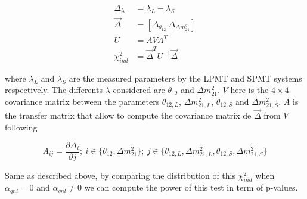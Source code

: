 \documentclass[../main.tex]{subfiles}
\begin{document}
\begin{align}
  \Delta_\lambda &= \lambda_{L} - \lambda_{S} \\
  \vec{\Delta} &= [ \Delta_{\theta_{12}} ~ \Delta_{\Delta m^2_{21}} ] \\
  U &= A V A^T \\
  \chi^2_{ind} &= \vec{\Delta}^T U^{-1} \vec{\Delta}
\end{align}

where $\lambda_{L}$ and $\lambda_{S}$ are the measured parameters by the LPMT and SPMT systems respectively. The differents $\lambda$ considered are $\theta_{12}$ and $\Delta m^2_{21}$. $V$ here is the $4\times 4$ covariance matrix between the parameters $\theta_{12, L}$, $\Delta m^2_{21, L}$, $\theta_{12, S}$ and  $\Delta m^2_{21, S}$. $A$ is the transfer matrix that allow to compute the covariance matrix de $\vec{\Delta}$ from $V$ following

\begin{equation}
  A_{ij} = \frac{\partial \Delta_i}{\partial j}; ~ i \in \{ \theta_{12}, \Delta m^2_{21} \}; ~ j \in \{ \theta_{12, L}, \Delta m^2_{21, L}, \theta_{12, S}, \Delta m^2_{21, S} \}
\end{equation}

Same as described above, by comparing the distribution of this $\chi^2_{ind}$ when $\alpha_{qnl} = 0$ and $\alpha_{qnl} \neq 0$ we can compute the power of this test in term of p-values.

%
%
%
%
%
%
%
%
%
\end{document}
